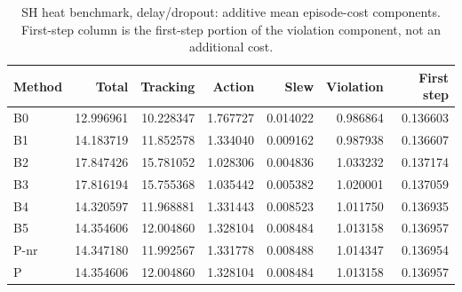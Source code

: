 \begin{table}[ht]
\caption{SH heat benchmark, delay/dropout: additive mean episode-cost components. First-step column is the first-step portion of the violation component, not an additional cost.}\label{tab:costparts_locked_delay_dropout}
\centering\small
\begin{tabular}{@{}lrrrrrr@{}}\toprule
Method & Total & Tracking & Action & Slew & Violation & First step\\\midrule
B0 & 12.996961 & 10.228347 & 1.767727 & 0.014022 & 0.986864 & 0.136603 \\
B1 & 14.183719 & 11.852578 & 1.334040 & 0.009162 & 0.987938 & 0.136607 \\
B2 & 17.847426 & 15.781052 & 1.028306 & 0.004836 & 1.033232 & 0.137174 \\
B3 & 17.816194 & 15.755368 & 1.035442 & 0.005382 & 1.020001 & 0.137059 \\
B4 & 14.320597 & 11.968881 & 1.331443 & 0.008523 & 1.011750 & 0.136935 \\
B5 & 14.354606 & 12.004860 & 1.328104 & 0.008484 & 1.013158 & 0.136957 \\
P-nr & 14.347180 & 11.992567 & 1.331778 & 0.008488 & 1.014347 & 0.136954 \\
P & 14.354606 & 12.004860 & 1.328104 & 0.008484 & 1.013158 & 0.136957 \\
\bottomrule\end{tabular}
\end{table}
